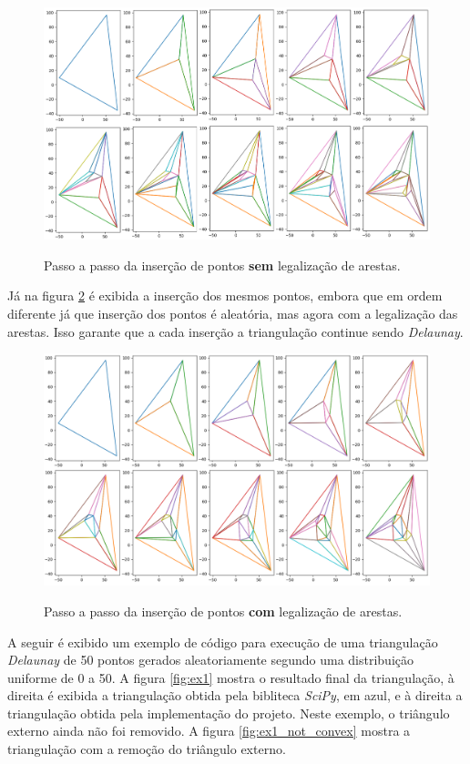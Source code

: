\documentclass[a4paper]{article}
\begin{document}
\begin{figure}[H]
	\centering
	\includegraphics[width=1.0\textwidth]{./imgs/ex2_final.png}
	\label{fig:ex2_final} 
	\caption[caption]{Passo a passo da inserção de pontos \textbf{sem} legalização de arestas.}
\end{figure}

Já na figura \ref{fig:ex3_final} é exibida a inserção dos mesmos pontos, embora que em ordem diferente já que inserção dos pontos é aleatória, mas agora com a legalização das arestas. Isso garante que a cada inserção a triangulação continue sendo \textit{Delaunay}.

\begin{figure}[H]
	\centering
	\includegraphics[width=1.0\textwidth]{./imgs/ex3_final.png}
	\label{fig:ex3_final} 
	\caption[caption]{Passo a passo da inserção de pontos \textbf{com} legalização de arestas.}
\end{figure}



A seguir é exibido um exemplo de código para execução de uma triangulação \textit{Delaunay} de 50 pontos gerados aleatoriamente segundo uma distribuição uniforme de 0 a 50. A figura \ref{fig:ex1} mostra o resultado final da triangulação, à direita é exibida a triangulação obtida pela bibliteca \textit{SciPy}, em azul, e à direita a triangulação obtida pela implementação do projeto. Neste exemplo, o triângulo externo ainda não foi removido. A figura \ref{fig:ex1_not_convex} mostra a triangulação com a remoção do triângulo externo.
\end{document}
